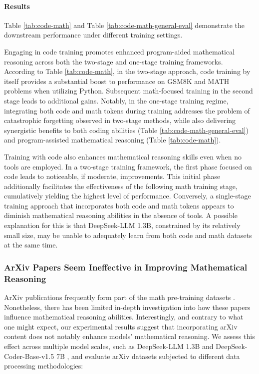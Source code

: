 \begin{itemize}[topsep=0pt]
\begin{itemize}[topsep=0pt]
\paragraph{Results}
Table \ref{tab:code-math} and Table \ref{tab:code-math-general-eval} demonstrate the downstream performance under different training settings.

Engaging in code training promotes enhanced program-aided mathematical reasoning across both the two-stage and one-stage training frameworks. According to Table \ref{tab:code-math}, in the two-stage approach, code training by itself provides a substantial boost to performance on GSM8K and MATH problems when utilizing Python. Subsequent math-focused training in the second stage leads to additional gains. Notably, in the one-stage training regime, integrating both code and math tokens during training addresses the problem of catastrophic forgetting observed in two-stage methods, while also delivering synergistic benefits to both coding abilities (Table \ref{tab:code-math-general-eval}) and program-assisted mathematical reasoning (Table \ref{tab:code-math}).

Training with code also enhances mathematical reasoning skills even when no tools are employed. In a two-stage training framework, the first phase focused on code leads to noticeable, if moderate, improvements. This initial phase additionally facilitates the effectiveness of the following math training stage, cumulatively yielding the highest level of performance. Conversely, a single-stage training approach that incorporates both code and math tokens appears to diminish mathematical reasoning abilities in the absence of tools. A possible explanation for this is that DeepSeek-LLM 1.3B, constrained by its relatively small size, may be unable to adequately learn from both code and math datasets at the same time.

\subsubsection{ArXiv Papers Seem Ineffective in Improving Mathematical Reasoning}

ArXiv publications frequently form part of the math pre-training datasets \citep{minerva,gpt-f,llemma,mathpile}. Nonetheless, there has been limited in-depth investigation into how these papers influence mathematical reasoning abilities. Interestingly, and contrary to what one might expect, our experimental results suggest that incorporating arXiv content does not notably enhance models' mathematical reasoning. We assess this effect across multiple model scales, such as DeepSeek-LLM 1.3B and DeepSeek-Coder-Base-v1.5 7B \citep{deepseek-coder}, and evaluate arXiv datasets subjected to different data processing methodologies:


\end{itemize}
\end{itemize}

